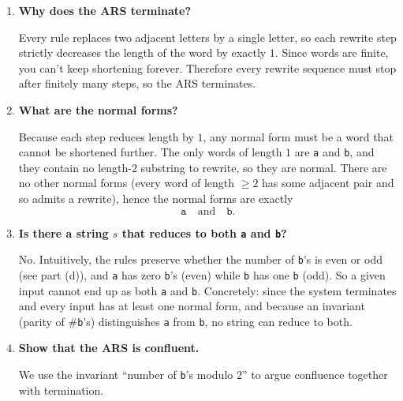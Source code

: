 \documentclass[12pt]{article}
\begin{document}
\begin{enumerate}[label=(\alph*)]
  \item \textbf{Why does the ARS terminate?}
  
  Every rule replaces two adjacent letters by a single letter, so each rewrite step strictly decreases the length of the word by exactly $1$. Since words are finite, you can't keep shortening forever. Therefore every rewrite sequence must stop after finitely many steps, so the ARS terminates.
  
  \item \textbf{What are the normal forms?}
  
  Because each step reduces length by $1$, any normal form must be a word that cannot be shortened further. The only words of length $1$ are \texttt{a} and \texttt{b}, and they contain no length-$2$ substring to rewrite, so they are normal. There are no other normal forms (every word of length $\ge 2$ has some adjacent pair and so admits a rewrite), hence the normal forms are exactly
  \[
    \texttt{a}\quad\text{and}\quad\texttt{b}.
  \]
  
  \item \textbf{Is there a string \(s\) that reduces to both \texttt{a} and \texttt{b}?}
  
  No. Intuitively, the rules preserve whether the number of \texttt{b}'s is even or odd (see part (d)), and \texttt{a} has zero \texttt{b}'s (even) while \texttt{b} has one \texttt{b} (odd). So a given input cannot end up as both \texttt{a} and \texttt{b}. Concretely: since the system terminates and every input has at least one normal form, and because an invariant (parity of \#\texttt{b}'s) distinguishes \texttt{a} from \texttt{b}, no string can reduce to both.
  
  \item \textbf{Show that the ARS is confluent.}
  
  We use the invariant ``number of \texttt{b}'s modulo $2$'' to argue confluence together with termination.
  

\end{enumerate}
\end{document}
